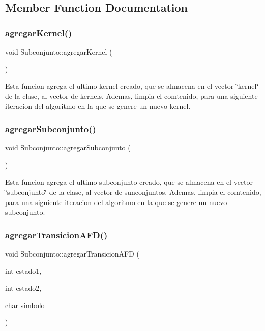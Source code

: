 \subsection{Member Function Documentation}
\mbox{\label{class_subconjunto_a665f23eb3984050eef0a6b5cf6e81b57}} 
\subsubsection{\texorpdfstring{agregar\+Kernel()}{agregarKernel()}}
{\footnotesize\ttfamily void Subconjunto\+::agregar\+Kernel (\begin{DoxyParamCaption}{ }\end{DoxyParamCaption})}

Esta funcion agrega el ultimo kernel creado, que se almacena en el vector \char`\"{}kernel\char`\"{} de la clase, al vector de kernels. Ademas, limpia el comtenido, para una siguiente iteracion del algoritmo en la que se genere un nuevo kernel. \mbox{\label{class_subconjunto_a2d9a6c5c2296b12e57b1b16740a2477f}} 
\subsubsection{\texorpdfstring{agregar\+Subconjunto()}{agregarSubconjunto()}}
{\footnotesize\ttfamily void Subconjunto\+::agregar\+Subconjunto (\begin{DoxyParamCaption}{ }\end{DoxyParamCaption})}

Esta funcion agrega el ultimo subconjunto creado, que se almacena en el vector \char`\"{}subconjunto\char`\"{} de la clase, al vector de sunconjuntos. Ademas, limpia el comtenido, para una siguiente iteracion del algoritmo en la que se genere un nuevo subconjunto. \mbox{\label{class_subconjunto_a244094bad3df640fe76b10ce9dde80a2}} 
\subsubsection{\texorpdfstring{agregar\+Transicion\+A\+F\+D()}{agregarTransicionAFD()}}
{\footnotesize\ttfamily void Subconjunto\+::agregar\+Transicion\+A\+FD (\begin{DoxyParamCaption}\item[{int}]{estado1,  }\item[{int}]{estado2,  }\item[{char}]{simbolo }\end{DoxyParamCaption})}

